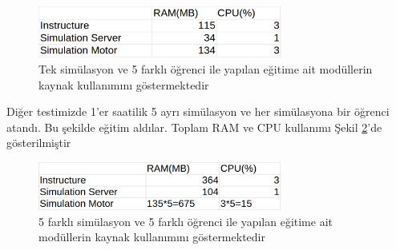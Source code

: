 \documentclass[conference]{IEEEtran}
\begin{document}
\begin{figure}[h!]
  \centering
  \includegraphics[width=8cm]{hepsibir.png}
  \caption{Tek simülasyon ve 5 farklı öğrenci ile yapılan eğitime ait modüllerin kaynak kullanımını göstermektedir}\label{fig:hepsibir}
  
\end{figure}

Diğer testimizde 1'er saatilik 5 ayrı simülasyon ve her simülasyona bir öğrenci atandı. Bu şekilde eğitim aldılar. Toplam RAM ve CPU kullanımı Şekil \ref{fig:hepsiayri}'de gösterilmiştir

\begin{figure}[h!]
  \centering
  \includegraphics[width=8cm]{hepsiayri.png}
  \caption{5 farklı simülasyon ve 5 farklı öğrenci ile yapılan eğitime ait modüllerin kaynak kullanımını göstermektedir}\label{fig:hepsiayri}
  
\end{figure}
\end{document}
